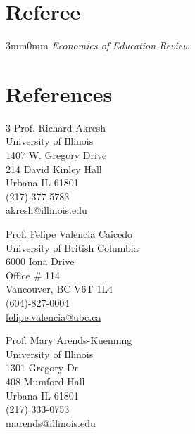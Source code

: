 \documentclass[letterpaper,11pt]{article}
\begin{document}
\section{Referee}
\begin{adjustwidth}{3mm}{0mm}
\textit{Economics of Education Review}
\end{adjustwidth}

\section*{References}
\begin{multicols}{3}
    \noindent
    Prof. Richard Akresh \\
    University of Illinois \\
    1407 W. Gregory Drive \\
    214 David Kinley Hall \\
    Urbana IL 61801 \\
    (217)-377-5783 \\
    \href{mailto:akresh@illinois.edu}{akresh@illinois.edu}
    \columnbreak

    \noindent
    Prof. Felipe Valencia Caicedo \\
    University of British Columbia \\
    6000 Iona Drive \\
    Office \# 114 \\
    Vancouver, BC V6T 1L4  \\
    (604)-827-0004 \\
    \href{mailto:felipe.valencia@ubc.ca}{felipe.valencia@ubc.ca}
    \columnbreak

    \noindent
    Prof. Mary Arends-Kuenning \\
    University of Illinois \\
    1301 Gregory Dr \\
    408 Mumford Hall \\
    Urbana IL 61801 \\
    (217) 333-0753 \\
    \href{mailto:marends@illinois.edu}{marends@illinois.edu}
\end{multicols}
\end{document}
